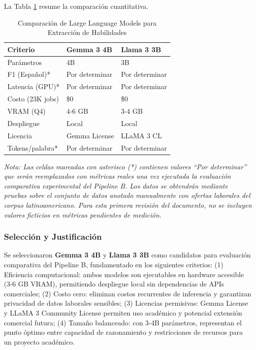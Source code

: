 La Tabla \ref{tab:comparacion-llms} resume la comparación cuantitativa.

\begin{table}[H]
\centering
\caption{Comparación de Large Language Models para Extracción de Habilidades}
\label{tab:comparacion-llms}
\begin{tabular}{|p{4cm}|p{4cm}|p{4cm}|}
\hline
\textbf{Criterio} & \textbf{Gemma 3 4B} & \textbf{Llama 3 3B} \\
\hline
Parámetros & 4B & 3B \\
\hline
F1 (Español)* & Por determinar & Por determinar \\
\hline
Latencia (GPU)* & Por determinar & Por determinar \\
\hline
Costo (23K jobs) & \$0 & \$0 \\
\hline
VRAM (Q4) & 4-6 GB & 3-4 GB \\
\hline
Despliegue & Local & Local \\
\hline
Licencia & Gemma License & LLaMA 3 CL \\
\hline
Tokens/palabra* & Por determinar & Por determinar \\
\hline
\end{tabular}
\end{table}

\textit{Nota: Las celdas marcadas con asterisco (*) contienen valores ``Por determinar'' que serán reemplazados con métricas reales una vez ejecutada la evaluación comparativa experimental del Pipeline B. Los datos se obtendrán mediante pruebas sobre el conjunto de datos anotado manualmente con ofertas laborales del corpus latinoamericano. Para esta primera revisión del documento, no se incluyen valores ficticios en métricas pendientes de medición.}

\subsubsection{Selección y Justificación}

Se seleccionaron \textbf{Gemma 3 4B} y \textbf{Llama 3 3B} como candidatos para evaluación comparativa del Pipeline B, fundamentado en los siguientes criterios: (1) Eficiencia computacional: ambos modelos son ejecutables en hardware accesible (3-6 GB VRAM), permitiendo despliegue local sin dependencias de APIs comerciales; (2) Costo cero: eliminan costos recurrentes de inferencia y garantizan privacidad de datos laborales sensibles; (3) Licencias permisivas: Gemma License y LLaMA 3 Community License permiten uso académico y potencial extensión comercial futura; (4) Tamaño balanceado: con 3-4B parámetros, representan el punto óptimo entre capacidad de razonamiento y restricciones de recursos para un proyecto académico.


